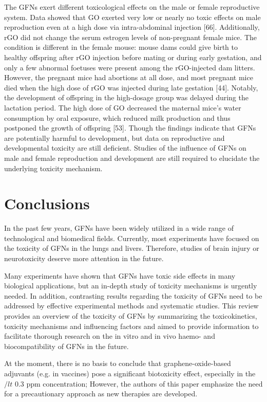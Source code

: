 \documentclass[twoside,twocolumn,9pt]{article}
\begin{document}
The GFNs exert different toxicological effects on the male or female reproductive system. Data showed that GO exerted very low or nearly no toxic effects on male reproduction even at a high dose via intra-abdominal injection [66]. Additionally, rGO did not change the serum estrogen levels of non-pregnant female mice. The condition is different in the female mouse: mouse dams could give birth to healthy offspring after rGO injection before mating or during early gestation, and only a few abnormal foetuses were present among the rGO-injected dam litters. However, the pregnant mice had abortions at all dose, and most pregnant mice died when the high dose of rGO was injected during late gestation [44]. Notably, the development of offspring in the high-dosage group was delayed during the lactation period. The high dose of GO decreased the maternal mice’s water consumption by oral exposure, which reduced milk production and thus postponed the growth of offspring [53]. Though the findings indicate that GFNs are potentially harmful to development, but data on reproductive and developmental toxicity are still deficient. Studies of the influence of GFNs on male and female reproduction and development are still required to elucidate the underlying toxicity mechanism.

\section{Conclusions}
In the past few years, GFNs have been widely utilized in a wide range of technological and biomedical fields. Currently, most experiments have focused on the toxicity of GFNs in the lungs and livers. Therefore, studies of brain injury or neurotoxicity deserve more attention in the future. 

Many experiments have shown that GFNs have toxic side effects in many biological applications, but an in-depth study of toxicity mechanisms is urgently needed. In addition, contrasting results regarding the toxicity of GFNs need to be addressed by effective experimental methods and systematic studies. This review provides an overview of the toxicity of GFNs by summarizing the toxicokinetics, toxicity mechanisms and influencing factors and aimed to provide information to facilitate thorough research on the in vitro and in vivo haemo- and biocompatibility of GFNs in the future. 

At the moment, there is no basis to conclude that graphene-oxide-based adjuvants (e.g. in vaccines) pose a significant biotoxicity effect, especially in the $/lt$ 0.3 ppm concentration; However, the authors of this paper emphasize the need for a precautionary approach as new therapies are developed.  
\end{document}
